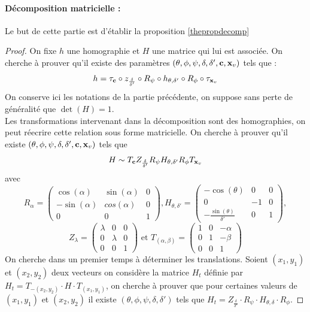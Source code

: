 \paragraph{Décomposition matricielle :}
Le but de cette partie est d'établir la proposition \ref{thepropdecomp}

\begin{proof}
On fixe $h$ une homographie et $H$ une matrice qui lui est associée. On cherche à prouver qu'il existe des paramètres $(\theta,\phi,\psi,\delta,\delta',\mathbf{c},\mathbf{x}_v)$ tels que :
\begin{equation*}
h= \tau_{\mathbf{c}} \circ z_{\frac{\delta}{\delta'}}\circ R_{\psi} \circ h_{\theta,\delta'} \circ R_{\phi} \circ \tau_{\mathbf{x}_v}
\end{equation*}
On conserve ici les notations de la partie précédente, on suppose sans perte de généralité que $\det (H)=1$.\\
Les transformations intervenant dans la décomposition sont des homographies, on peut réecrire cette relation sous forme matricielle. On cherche à prouver qu'il existe $(\theta,\phi,\psi,\delta,\delta',\mathbf{c},\mathbf{x}_v)$ tels que
\begin{equation*}
H\sim T_{\mathbf{c}} Z_{\frac{\delta}{\delta'}}  R_{\psi}  H_{\theta,\delta'} R_{\phi}  T_{\mathbf{x}_v}
\end{equation*}
avec
\begin{equation*}
R_{\alpha}=\begin{pmatrix}
\cos(\alpha)&\sin(\alpha)&0\\-\sin(\alpha)&cos(\alpha)&0\\0&0&1
\end{pmatrix}
, H_{\theta,\delta'}=\begin{pmatrix}
-\cos(\theta)&0&0\\0&-1&0\\-\frac{\sin(\theta)}{\delta'}&0&1
\end{pmatrix},
\end{equation*}
\begin{equation*}
Z_{\lambda}=\begin{pmatrix}
\lambda&0&0\\0&\lambda&0\\0&0&1
\end{pmatrix}
\text{ et } T_{(\alpha,\beta)}=\begin{pmatrix}
1&0&-\alpha\\0&1&-\beta\\0&0&1
\end{pmatrix}
\end{equation*}
 On cherche dans un premier temps à déterminer les translations. Soient $(x_1 , y_1 )$ et $(x_2 , y_2 )$ deux vecteurs on considère la matrice $H_t$ définie par $H_t = T_{-(x_2 , y_2 )}  \cdot H \cdot T_{(x_1 , y_1 )}$, on cherche à prouver que pour certaines valeurs de $(x_1 , y_1 )$ et $(x_2 , y_2 )$  il existe  $(\theta,\phi,\psi,\delta,\delta')$ tels que   $H_t=Z_{\frac{\delta}{\delta'}} \cdot R_{\psi} \cdot H_{\theta,\delta} \cdot R_{\phi}$.
 

\end{proof}
